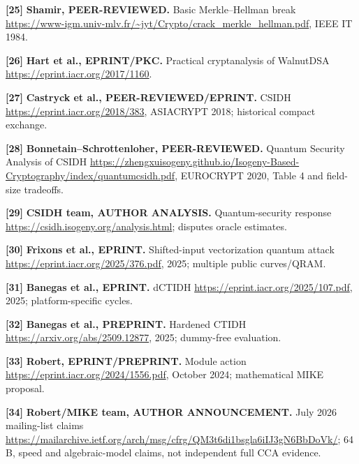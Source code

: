 \documentclass[
  10pt,
  a4paper,
]{article}
\begin{document}
\hypertarget{ref25}{}

\textbf{{[}25{]}} \textbf{Shamir, PEER-REVIEWED.} Basic Merkle--Hellman
break
\url{https://www-igm.univ-mlv.fr/~jyt/Crypto/crack_merkle_hellman.pdf},
IEEE IT 1984.

\hypertarget{ref26}{}

\textbf{{[}26{]}} \textbf{Hart et al., EPRINT/PKC.} Practical
cryptanalysis of WalnutDSA \url{https://eprint.iacr.org/2017/1160}.

\hypertarget{ref27}{}

\textbf{{[}27{]}} \textbf{Castryck et al., PEER-REVIEWED/EPRINT.} CSIDH
\url{https://eprint.iacr.org/2018/383}, ASIACRYPT 2018; historical
compact exchange.

\hypertarget{ref28}{}

\textbf{{[}28{]}} \textbf{Bonnetain--Schrottenloher, PEER-REVIEWED.}
Quantum Security Analysis of CSIDH
\url{https://zhengxuisogeny.github.io/Isogeny-Based-Cryptography/index/quantumcsidh.pdf},
EUROCRYPT 2020, Table 4 and field-size tradeoffs.

\hypertarget{ref29}{}

\textbf{{[}29{]}} \textbf{CSIDH team, AUTHOR ANALYSIS.} Quantum-security
response \url{https://csidh.isogeny.org/analysis.html}; disputes oracle
estimates.

\hypertarget{ref30}{}

\textbf{{[}30{]}} \textbf{Frixons et al., EPRINT.} Shifted-input
vectorization quantum attack \url{https://eprint.iacr.org/2025/376.pdf},
2025; multiple public curves/QRAM.

\hypertarget{ref31}{}

\textbf{{[}31{]}} \textbf{Banegas et al., EPRINT.} dCTIDH
\url{https://eprint.iacr.org/2025/107.pdf}, 2025; platform-specific
cycles.

\hypertarget{ref32}{}

\textbf{{[}32{]}} \textbf{Banegas et al., PREPRINT.} Hardened CTIDH
\url{https://arxiv.org/abs/2509.12877}, 2025; dummy-free evaluation.

\hypertarget{ref33}{}

\textbf{{[}33{]}} \textbf{Robert, EPRINT/PREPRINT.} Module action
\url{https://eprint.iacr.org/2024/1556.pdf}, October 2024; mathematical
MIKE proposal.

\hypertarget{ref34}{}

\textbf{{[}34{]}} \textbf{Robert/MIKE team, AUTHOR ANNOUNCEMENT.} July
2026 mailing-list claims
\url{https://mailarchive.ietf.org/arch/msg/cfrg/QM3t6di1bsgla6iIJ3gN6BbDoVk/};
64 B, speed and algebraic-model claims, not independent full CCA
evidence.
\end{document}
